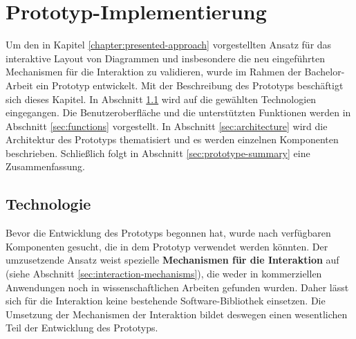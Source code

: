 
\chapter{Prototyp-Implementierung}
\label{chapter:prototype}

Um den in Kapitel \ref{chapter:presented-approach} vorgestellten Ansatz für das interaktive Layout von Diagrammen und insbesondere die neu eingeführten Mechanismen für die Interaktion zu validieren, wurde im Rahmen der Bachelor-Arbeit ein Prototyp entwickelt. Mit der Beschreibung des Prototyps beschäftigt sich dieses Kapitel. In Abschnitt \ref{sec:technologies} wird auf die gewählten Technologien eingegangen. Die Benutzeroberfläche und die unterstützten Funktionen werden in Abschnitt \ref{sec:functions} vorgestellt. In Abschnitt \ref{sec:architecture} wird die Architektur des Prototyps thematisiert und es werden einzelnen Komponenten beschrieben. Schließlich folgt in Abschnitt \ref{sec:prototype-summary} eine Zusammenfassung.

\section{Technologie}
\label{sec:technologies}

Bevor die Entwicklung des Prototyps begonnen hat, wurde nach verfügbaren Komponenten gesucht, die in dem Prototyp verwendet werden könnten. Der umzusetzende Ansatz weist spezielle \textbf{Mechanismen für die Interaktion} auf (siehe Abschnitt \ref{sec:interaction-mechanisms}), die weder in kommerziellen Anwendungen noch in wissenschaftlichen Arbeiten gefunden wurden. Daher lässt sich für die Interaktion keine bestehende Software-Bibliothek einsetzen. Die Umsetzung der Mechanismen der Interaktion bildet deswegen einen wesentlichen Teil der Entwicklung des Prototyps.

